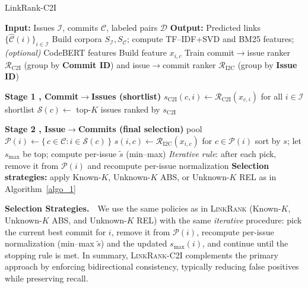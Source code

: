 \begin{algorithm}[htbp]
\caption{LinkRank-C2I}
\label{algo_2}
\begin{algorithmic}[1]
\STATE \textbf{Input:} Issues $\mathcal{I}$, commits $\mathcal{C}$, labeled pairs $\mathcal{D}$
\STATE \textbf{Output:} Predicted links $\{\widehat{\mathcal{C}}(i)\}_{i\in\mathcal{I}}$
\STATE Build corpora $S_{\mathcal{I}}, S_{\mathcal{C}}$; compute TF--IDF{+}SVD and BM25 features; \textit{(optional) }CodeBERT features
  \STATE Build feature $x_{i,c}$ 
\ENDFOR
\STATE Train commit$\rightarrow$issue ranker $\mathcal{R}_{\text{C2I}}$ (group by \textbf{Commit ID}) and issue$\rightarrow$commit ranker $\mathcal{R}_{\text{I2C}}$ (group by \textbf{Issue ID})

\vspace{0.25em}
\STATE \textbf{Stage 1 ,  Commit$\rightarrow$Issues (shortlist)}
  \STATE $s_{\text{C2I}}(c,i)\gets \mathcal{R}_{\text{C2I}}(x_{c,i})$ for all $i\in\mathcal{I}$
  \STATE shortlist $\mathcal{S}(c)\gets$ top-$K$ issues ranked by $s_{\text{C2I}}$
\ENDFOR

\vspace{0.25em}
\STATE \textbf{Stage 2 ,  Issue$\rightarrow$Commits (final selection)}
  \STATE pool $\mathcal{P}(i)\gets \{\,c\in\mathcal{C}: i\in\mathcal{S}(c)\,\}$
  \STATE $s(i,c)\gets \mathcal{R}_{\text{I2C}}(x_{i,c})$ for $c\in\mathcal{P}(i)$
  \STATE sort by $s$; let $s_{\max}$ be top; compute per-issue $\tilde{s}$ (min--max)
  \STATE \textit{Iterative rule}: after each pick, remove it from $\mathcal{P}(i)$ and recompute per-issue normalization
  \STATE \textbf{Selection strategies:} apply Known-$K$, Unknown-$K$ ABS, or Unknown-$K$ REL as in Algorithm~\ref{algo_1}
\ENDFOR
\end{algorithmic}
\end{algorithm}

\noindent
\textbf{Selection Strategies.}\ \
We use the same policies as in \textsc{LinkRank} (Known-$K$, Unknown-$K$ ABS, and Unknown-$K$ REL) with the same \emph{iterative} procedure: pick the current best commit for $i$, remove it from $\mathcal{P}(i)$, recompute per-issue normalization (min--max $\tilde{s}$) and the updated $s_{\max}(i)$, and continue until the stopping rule is met. In summary, \textsc{LinkRank-C2I} complements the primary approach by enforcing bidirectional consistency, typically reducing false positives while preserving recall.


